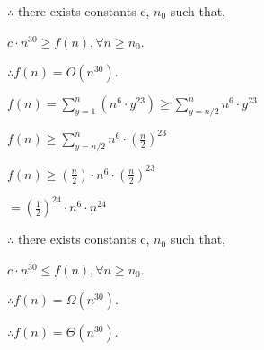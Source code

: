 \documentclass[12pt]{article}
\begin{document}
\begin{enumerate}
$\therefore$ there exists constants c, $n_0$ such that,

$ c \cdot n^{30} \geq f(n), \forall n \geq n_0$.

$\therefore f(n) = O(n^{30})$.

$f(n) = \sum^n_{y{=}1} (n^6\cdot y^{23}) \geq \sum^n_{y{=}{n/2}}n^6\cdot y^{23}$

$f(n)\geq \sum^n_{y=n/2}n^6 \cdot (\frac{n}{2})^{23}$

$f(n)\geq (\frac{n}{2})\cdot n^6 \cdot (\frac{n}{2})^{23}$

$=(\frac{1}{2})^{24}\cdot n^6 \cdot n^{24}$

$\therefore$ there exists constants c, $n_0$ such that,

$ c \cdot n^{30} \leq f(n), \forall n \geq n_0$.

$\therefore f(n) = \Omega(n^{30})$.

$\therefore f(n) = \Theta(n^{30})$.


\end{enumerate} 
\end{document}
